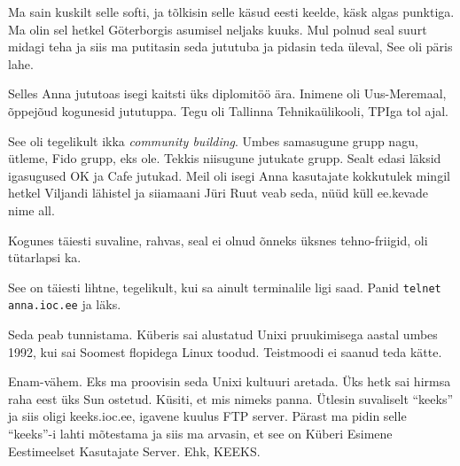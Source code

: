 
Ma sain kuskilt selle softi, ja tõlkisin selle käsud eesti keelde, käsk algas 
punktiga. Ma olin sel hetkel Göterborgis asumisel neljaks kuuks. Mul polnud 
seal suurt midagi teha ja siis ma putitasin seda jututuba ja pidasin teda 
üleval, See oli päris lahe. 

Selles Anna jututoas isegi kaitsti üks diplomitöö ära. Inimene oli 
Uus-Meremaal,  õppejõud kogunesid jututuppa. Tegu oli  Tallinna 
Tehnikaülikooli,  TPIga tol ajal.


See oli tegelikult ikka \emph{community building}. Umbes samasugune grupp nagu, 
ütleme, Fido grupp, eks ole. Tekkis niisugune jutukate grupp. Sealt edasi 
läksid igasugused OK  ja 
Cafe jutukad. Meil oli 
isegi Anna  kasutajate kokkutulek mingil hetkel Viljandi lähistel ja siiamaani 
Jüri Ruut veab seda, nüüd küll ee.kevade nime all.

Kogunes täiesti suvaline, rahvas, seal ei olnud õnneks üksnes tehno-friigid, 
oli tütarlapsi ka. 


See on täiesti lihtne, tegelikult, kui sa ainult terminalile ligi saad. Panid 
\verb|telnet anna.ioc.ee| ja läks. 


Seda peab tunnistama. Küberis sai alustatud Unixi pruukimisega aastal umbes 
1992, kui sai Soomest flopidega Linux toodud. Teistmoodi ei 
saanud teda kätte. 


Enam-vähem.  Eks ma proovisin seda Unixi kultuuri aretada. Üks hetk sai hirmsa 
raha eest üks  Sun ostetud. Küsiti, et mis  nimeks panna. Ütlesin suvaliselt 
\enquote{keeks} ja siis oligi keeks.ioc.ee, igavene 
kuulus FTP server. Pärast ma pidin selle \enquote{keeks}-i lahti mõtestama ja 
siis ma arvasin, et see on Küberi Esimene Eestimeelset Kasutajate Server. Ehk, 
KEEKS.

